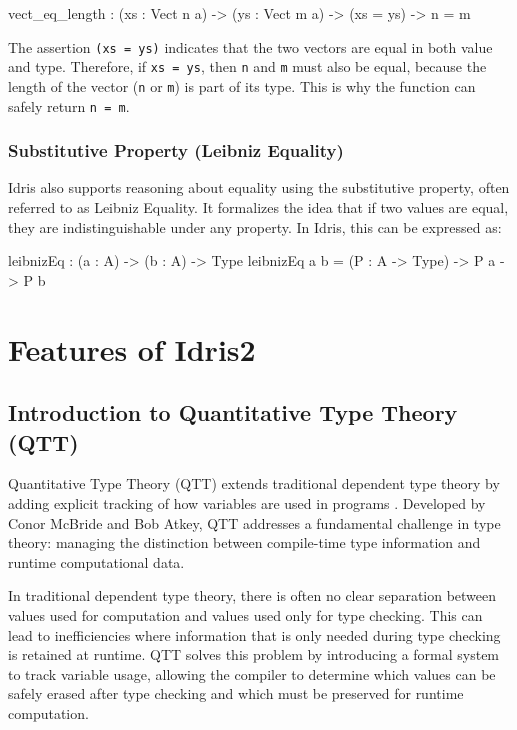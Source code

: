 \documentclass[]{rptuseminar}
\begin{document}
\begin{idris}
vect_eq_length : (xs : Vect n a) -> (ys : Vect m a) ->
(xs = ys) -> n = m 
\end{idris}

The assertion \texttt{(xs = ys)} indicates that the two vectors are equal in both value and type. Therefore, if \texttt{xs = ys}, then \texttt{n} and \texttt{m} must also be equal, because the length of the vector (\texttt{n} or \texttt{m}) is part of its type. This is why the function can safely return \texttt{n = m}.

\subsubsection{Substitutive Property (Leibniz Equality)}
Idris also supports reasoning about equality using the substitutive property, often referred to as Leibniz Equality. It formalizes the idea that if two values are equal, they are indistinguishable under any property. In Idris, this can be expressed as:

\begin{idris}
leibnizEq : (a : A) -> (b : A) -> Type
leibnizEq a b = (P : A -> Type) -> P a -> P b
\end{idris}
\section{Features of Idris2}  
\label{sec:features}

\subsection{Introduction to Quantitative Type Theory (QTT)}
\label{sec:qtt}
Quantitative Type Theory (QTT) extends traditional dependent type theory by adding explicit tracking of how variables are used in programs \cite{atkey2018syntax}. Developed by Conor McBride and Bob Atkey, QTT addresses a fundamental challenge in type theory: managing the distinction between compile-time type information and runtime computational data.

In traditional dependent type theory, there is often no clear separation between values used for computation and values used only for type checking. This can lead to inefficiencies where information that is only needed during type checking is retained at runtime. QTT solves this problem by introducing a formal system to track variable usage, allowing the compiler to determine which values can be safely erased after type checking and which must be preserved for runtime computation.
\end{document}
